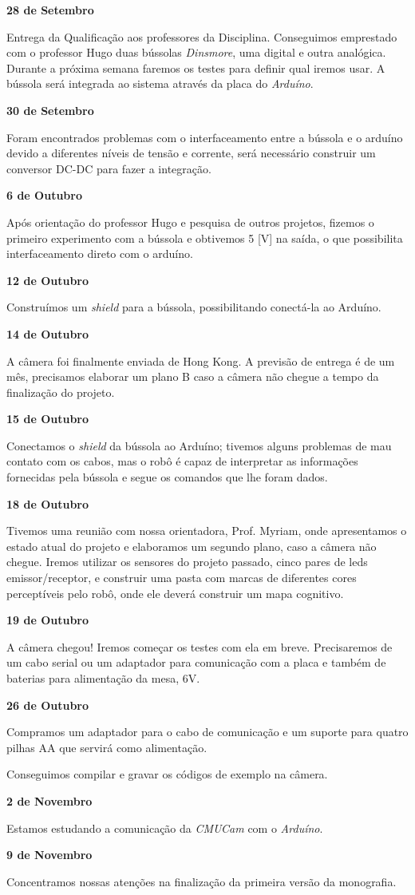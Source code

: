 \textbf{28 de Setembro}

Entrega da Qualificação aos professores da Disciplina. Conseguimos emprestado com o professor Hugo duas bússolas \textit{Dinsmore}, uma digital e outra analógica. Durante a próxima semana faremos os testes para definir qual iremos usar. A bússola será integrada ao sistema através da placa do \textit{Arduíno}.

\textbf{30 de Setembro}

Foram encontrados problemas com o interfaceamento entre a bússola e o arduíno devido a diferentes níveis de tensão e corrente, será necessário construir um conversor DC-DC para fazer a integração.

\textbf{6 de Outubro}

Após orientação do professor Hugo e pesquisa de outros projetos, fizemos o primeiro experimento com a bússola e obtivemos 5 [V] na saída, o que possibilita interfaceamento direto com o arduíno. 

\textbf{12 de Outubro}

Construímos um \textit{shield} para a bússola, possibilitando conectá-la ao Arduíno.

\textbf{14 de Outubro}

A câmera foi finalmente enviada de Hong Kong. A previsão de entrega é de um mês, precisamos elaborar um plano B caso a câmera não chegue a tempo da finalização do projeto.

\textbf{15 de Outubro}

Conectamos o \textit{shield} da bússola ao Arduíno; tivemos alguns problemas de mau contato com os cabos, mas o robô é capaz de interpretar as informações fornecidas pela bússola e segue os comandos que lhe foram dados. 

\textbf{18 de Outubro}

Tivemos uma reunião com nossa orientadora, Prof. Myriam, onde apresentamos o estado atual do projeto e elaboramos um segundo plano, caso a câmera não chegue. Iremos utilizar os sensores do projeto passado, cinco pares de leds emissor/receptor, e construir uma pasta com marcas de diferentes cores perceptíveis pelo robô, onde ele deverá construir um mapa cognitivo. 

\textbf{19 de Outubro}

A câmera chegou! Iremos começar os testes com ela em breve. Precisaremos de um cabo serial ou um adaptador para comunicação com a placa e também de baterias para alimentação da mesa, 6V.

\textbf{26 de Outubro}

Compramos um adaptador para o cabo de comunicação e um suporte para quatro pilhas AA que servirá como alimentação.

Conseguimos compilar e gravar os códigos de exemplo na câmera.

\textbf{2 de Novembro}

Estamos estudando a comunicação da \textit{CMUCam} com o \textit{Arduíno}.

\textbf{9 de Novembro}

Concentramos nossas atenções na finalização da primeira versão da monografia.
